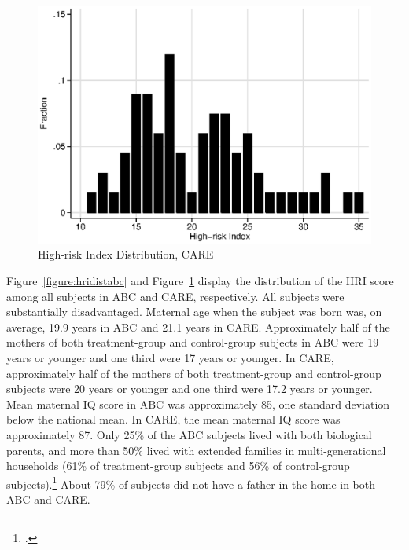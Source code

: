 \begin{appendices}
\begin{center}
	\begin{figure}[H]
		\caption{High-risk Index Distribution, CARE} \label{figure:hridistcare}
		\centering
		\includegraphics[width=.95\columnwidth]{output/care_hri.eps}
	\end{figure}
\end{center}

\noindent Figure~\ref{figure:hridistabc} and Figure~\ref{figure:hridistcare} display the distribution of the HRI score among all subjects in ABC and CARE, respectively. All subjects were substantially disadvantaged. Maternal age when the subject was born was, on average, 19.9 years in ABC and 21.1 years in CARE. Approximately half of the mothers of both treatment-group and control-group subjects in ABC were 19 years or younger and one third were 17 years or younger. In CARE, approximately half of the mothers of both treatment-group and control-group subjects were 20 years or younger and one third were 17.2 years or younger.  Mean maternal IQ score in ABC was approximately 85, one standard deviation below the national mean. In CARE, the mean maternal IQ score was approximately 87. Only 25\% of the ABC subjects lived with both biological parents, and more than 50\% lived with extended families in multi-generational households (61\% of treatment-group subjects and 56\% of control-group subjects).\footnote{\citet{Ramey_Campbell_1991_childreninpoverty,Campbell_Ramey_1994_CD}.} About 79\% of subjects did not have a father in the home in both ABC and CARE. \\


\end{appendices}
